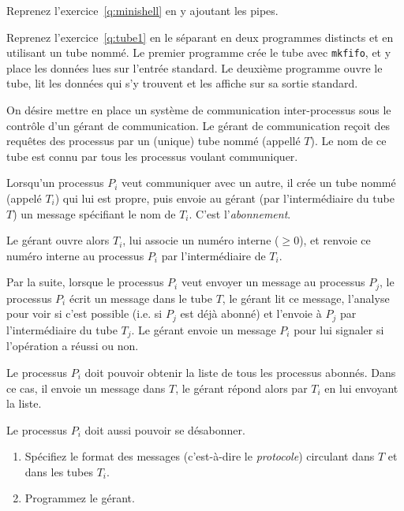 \question

Reprenez l'exercice~\ref {q:minishell} en y ajoutant les pipes.

\question

Reprenez l'exercice~\ref {q:tube1} en le séparant en deux
programmes distincts et en utilisant un tube nommé.  Le premier
programme crée le tube avec {\tt mkfifo}, et y place les données lues
sur l'entrée standard.  Le deuxième programme ouvre le tube, lit les
données qui s'y trouvent et les affiche sur sa sortie standard.


\question

On désire mettre en place un système de communication inter-processus
sous le contrôle d'un gérant de communication.  Le gérant de
communication reçoit des requêtes des processus par un (unique) tube
nommé (appellé $T$). Le nom de ce tube est connu par tous les processus
voulant communiquer.

Lorsqu'un processus $P_i$ veut communiquer avec un autre, il crée un
tube nommé (appelé $T_i$) qui lui est propre, puis envoie au gérant (par
l'intermédiaire du tube $T$) un message spécifiant le nom de $T_i$.
C'est l'{\em abonnement}.

Le gérant ouvre alors $T_i$, lui associe un numéro interne ($\geq 0$),
et renvoie ce numéro interne au processus $P_i$ par l'intermédiaire de
$T_i$.

Par la suite, lorsque le processus $P_i$ veut envoyer un message au
processus $P_j$, le processus $P_i$ écrit un message dans le tube $T$,
le gérant lit ce message, l'analyse pour voir si c'est possible (i.e.
si $P_j$ est déjà abonné) et l'envoie à $P_j$ par l'intermédiaire du
tube $T_j$. Le gérant envoie un message $P_i$ pour lui signaler si
l'opération a réussi ou non.

Le processus $P_i$ doit pouvoir obtenir la liste de tous les processus
abonnés. Dans ce cas, il envoie un message dans $T$, le gérant répond
alors par $T_i$ en lui envoyant la liste.

Le processus $P_i$ doit aussi pouvoir se désabonner.

\begin {enumerate}
    \item Spécifiez le format des messages (c'est-à-dire le {\em
	protocole}) circulant dans $T$ et dans les tubes $T_i$.

    \item Programmez le gérant.

\end {enumerate}


